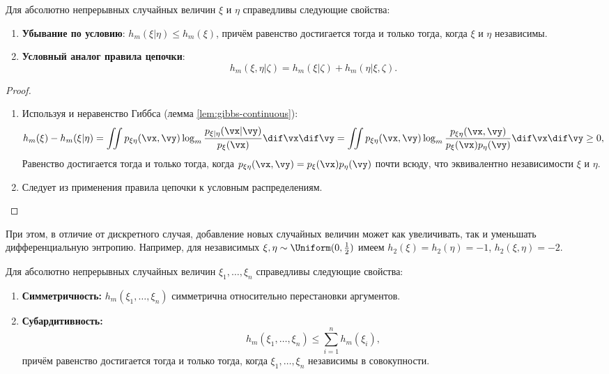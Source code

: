 \begin{proposition}
	\label{prop:cond-diff-entropy-props}
	Для абсолютно непрерывных случайных величин $\xi$ и $\eta$ справедливы следующие свойства:
	\begin{enumerate}
		\item \textbf{Убывание по условию}: $h_m(\xi | \eta) \leq h_m(\xi)$, причём равенство достигается тогда и только тогда, когда $\xi$ и $\eta$ независимы.
		\item \textbf{Условный аналог правила цепочки}:
			\[
				h_m(\xi, \eta | \zeta) = h_m(\xi | \zeta) + h_m(\eta | \xi, \zeta).
			\]
	\end{enumerate}
\end{proposition}
\begin{proof}\ 
	\begin{enumerate}
		\item Используя и неравенство Гиббса (лемма \ref{lem:gibbs-continuous}):
			\[
				h_m(\xi) - h_m(\xi|\eta) = \iint p_{\xi\eta}(\vx,\vy) \log_m \frac{p_{\xi|\eta}(\vx|\vy)}{p_\xi(\vx)} \dif\vx \dif\vy = \iint p_{\xi\eta}(\vx,\vy) \log_m \frac{p_{\xi\eta}(\vx,\vy)}{p_\xi(\vx)p_\eta(\vy)} \dif\vx \dif\vy \geq 0,
			\]
			Равенство достигается тогда и только тогда, когда $p_{\xi\eta}(\vx,\vy) = p_\xi(\vx)p_\eta(\vy)$ почти всюду, что эквивалентно независимости $\xi$ и $\eta$.
		
		\item Следует из применения правила цепочки к условным распределениям.
	\end{enumerate}
\end{proof}
\begin{remark}
	При этом, в отличие от дискретного случая, добавление новых случайных величин может как увеличивать, так и уменьшать дифференциальную энтропию. Например, для независимых $\xi, \eta \sim \Uniform(0,\tfrac12)$ имеем $h_2(\xi) = h_2(\eta) = -1$, $h_2(\xi,\eta) = -2$.
\end{remark}
\begin{proposition}
	Для абсолютно непрерывных случайных величин $\xi_1, \ldots, \xi_n$ справедливы следующие свойства:
	\begin{enumerate}
		\item \textbf{Симметричность:} $h_m(\xi_1, \ldots, \xi_n)$ симметрична относительно перестановки аргументов.
		\item \textbf{Субардитивность:} 
			\[
				h_m(\xi_1, \ldots, \xi_n) \leq \sum_{i=1}^n h_m(\xi_i),
			\]
			причём равенство достигается тогда и только тогда, когда $\xi_1, \ldots, \xi_n$ независимы в совокупности.
	\end{enumerate}
\end{proposition}
